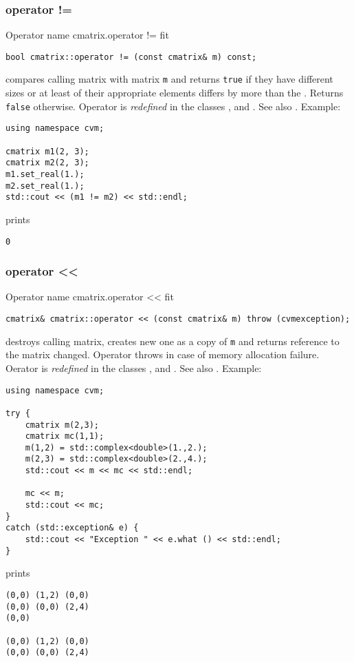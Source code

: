 \subsubsection{operator !=}
Operator%
\pdfdest name {cmatrix.operator !=} fit
\begin{verbatim}
bool cmatrix::operator != (const cmatrix& m) const;
\end{verbatim}
compares  calling matrix with  matrix \verb"m"
and returns \verb"true" if they have different sizes
or at least of their appropriate elements
differs by more than the
.
Returns \verb"false" otherwise.
Operator is \emph{redefined} in the classes
,  
and .
See also .
Example:
\begin{Verbatim}
using namespace cvm;

cmatrix m1(2, 3);
cmatrix m2(2, 3);
m1.set_real(1.);
m2.set_real(1.);
std::cout << (m1 != m2) << std::endl;
\end{Verbatim}
prints
\begin{Verbatim}
0
\end{Verbatim}
\newpage



\subsubsection{operator <{}<}
Operator%
\pdfdest name {cmatrix.operator <<} fit
\begin{verbatim}
cmatrix& cmatrix::operator << (const cmatrix& m) throw (cvmexception);
\end{verbatim}
destroys  calling matrix, creates  new one as a copy of \verb"m"
and returns  reference to
the matrix changed.
Operator throws  
in case of memory allocation failure.
Oerator is \emph{redefined} in the classes
,  
and .
See also .
Example:
\begin{Verbatim}
using namespace cvm;

try {
    cmatrix m(2,3);
    cmatrix mc(1,1);
    m(1,2) = std::complex<double>(1.,2.);
    m(2,3) = std::complex<double>(2.,4.);
    std::cout << m << mc << std::endl;

    mc << m;
    std::cout << mc;
}
catch (std::exception& e) {
    std::cout << "Exception " << e.what () << std::endl;
}
\end{Verbatim}
prints
\begin{Verbatim}
(0,0) (1,2) (0,0)
(0,0) (0,0) (2,4)
(0,0)

(0,0) (1,2) (0,0)
(0,0) (0,0) (2,4)
\end{Verbatim}
\newpage




